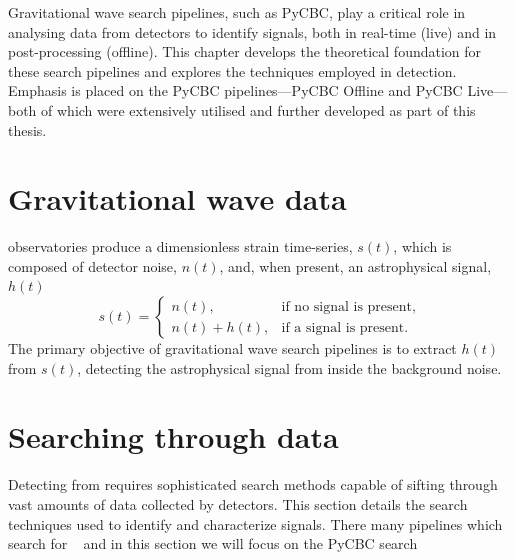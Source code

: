 



Gravitational wave search pipelines, such as PyCBC, play a critical role in analysing data from detectors to identify \gwadj signals, both in real-time (live) and in post-processing (offline). This chapter develops the theoretical foundation for these search pipelines and explores the techniques employed in \gwadj detection. Emphasis is placed on the PyCBC pipelines---PyCBC Offline and PyCBC Live---both of which were extensively utilised and further developed as part of this thesis.

\section{\label{2:sec:gw-data}Gravitational wave data}

\Gwadj observatories produce a dimensionless strain time-series, $s(t)$, which is composed of detector noise, $n(t)$, and, when present, an astrophysical \gwadj signal, $h(t)$
%
\begin{equation}
    s(t) =
    \begin{cases}
        n(t), & \text{if no signal is present}, \\
        n(t) + h(t), & \text{if a signal is present}.
    \end{cases}
\end{equation}
%
The primary objective of gravitational wave search pipelines is to extract $h(t)$ from $s(t)$, detecting the astrophysical signal from inside the background noise.

\section{\label{2:sec:search-methods}Searching through \gwadj data}

Detecting \gws from \cbcs requires sophisticated search methods capable of sifting through vast amounts of data collected by \gwadj detectors. This section details the search techniques used to identify and characterize \gwadj signals. There many pipelines which search for \gws~\cite{pipelines} and in this section we will focus on the PyCBC search~\cite{PyCBC:2016, PyCBC:2017, PyCBC_package:2021}

